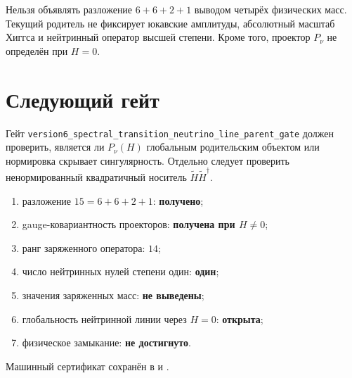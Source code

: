 \begin{nogocriterion}
Нельзя объявлять разложение $6+6+2+1$ выводом четырёх физических масс.
Текущий родитель не фиксирует юкавские амплитуды, абсолютный масштаб
Хиггса и нейтринный оператор высшей степени. Кроме того, проектор
$P_\nu$ не определён при $H=0$.
\end{nogocriterion}

\section{Следующий гейт}

Гейт
\texttt{version6\_spectral\_transition\_neutrino\_line\_parent\_gate}
должен проверить, является ли $P_\nu(H)$ глобальным родительским
объектом или нормировка скрывает сингулярность. Отдельно следует
проверить ненормированный квадратичный носитель
$\widetilde H\widetilde H^\dagger$.

\begin{protocol}
\begin{enumerate}
 \item разложение $15=6+6+2+1$: \textbf{получено};
 \item gauge-ковариантность проекторов: \textbf{получена при $H\ne0$};
 \item ранг заряженного оператора: \textbf{$14$};
 \item число нейтринных нулей степени один: \textbf{один};
 \item значения заряженных масс: \textbf{не выведены};
 \item глобальность нейтринной линии через $H=0$: \textbf{открыта};
 \item физическое замыкание: \textbf{не достигнуто}.
\end{enumerate}
\end{protocol}

Машинный сертификат сохранён в
 и
.

